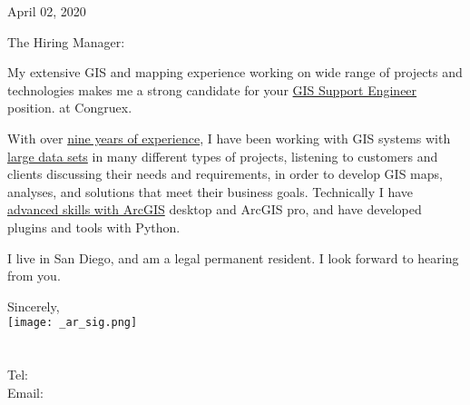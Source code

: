 \documentclass[letterpaper]{article}
\newcommand{\CVjobTitle}{GIS Support Engineer}
\newcommand{\CVcompany}{Congruex}
\newcommand{\impt}[1]{\uline{#1}}
\begin{document}
\large

\null\hfill April 02, 2020
\vspace{1em}

The Hiring Manager:

My extensive GIS and mapping experience working on wide range of projects and
technologies makes me a strong candidate for your \impt{\CVjobTitle} position.
at \CVcompany.

With over \impt{nine years of experience}, I have been working with GIS systems
with \impt{large data sets} in many different types of projects, listening to customers
and clients discussing their needs and requirements, in order to develop GIS
maps, analyses, and solutions that meet their business goals.  Technically I
have \impt{advanced skills with ArcGIS} desktop and ArcGIS pro, and have developed
plugins and tools with Python.


I live in San Diego, and am a legal permanent resident.  
I look forward to hearing from you.  



Sincerely,\\
\hspace{1em} \texttt{[image: \_ar\_sig.png]} \\
\CVname \\
\small
\CVaddresswrap \\
Tel: \CVphone \\
Email: \CVemail
\end{document}

